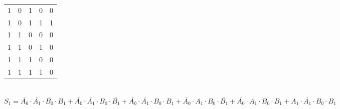 \begin{center}
\begin{minipage}{0.5\textwidth}
\begin{tabular}{cccc|c}
1              & 0              & 1              & 0              & 0                                      \\
1              & 0              & 1              & 1              & 1                                      \\
1              & 1              & 0              & 0              & 0                                      \\
1              & 1              & 0              & 1              & 0                                      \\
1              & 1              & 1              & 0              & 0                                      \\
1              & 1              & 1              & 1              & 0                                     
\end{tabular} \\[10pt]
$S_1 = \overline{A_0}\cdot\overline{A_1}\cdot\overline{B_0}\cdot{}B_1 + \overline{A_0}\cdot\overline{A_1}\cdot{}B_0\cdot\overline{B_1}+\overline{A_0}\cdot\overline{A_1}\cdot{}B_0\cdot{}B_1+\overline{A_0}\cdot{}A_1\cdot{}B_0\cdot\overline{B_1}+\overline{A_0}\cdot{}A_1\cdot{}B_0\cdot{}B_1+A_1\cdot{}\overline{A_1}\cdot{}B_0\cdot{}B_1$
\end{minipage}
\end{center}
